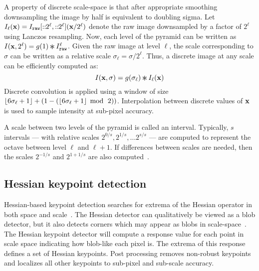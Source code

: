             A property of discrete scale-space is that after appropriate smoothing downsampling the image by half
            is equivalent to doubling sigma. Let
            $I_\ell(\mathbf{x}) = I_{\tt{raw}}[::\mkern-6mu2^{\ell},::\mkern-6mu2^{\ell}]({\mathbf{x}} / {2^{\ell}})$ 
            denote the raw image downsampled by a factor of $2^{\ell}$ using Lanczos resampling. Now, each level of
            the pyramid can be written as %
            $\img(\pt, 2^\ell) = g( 1 ) \conv \rawimg^\ell$. Given the raw image at level $\ell$, the scale
            corresponding to $\sigma$ can be written as a relative scale
            $\sigma_\ell = \sigma / 2^\ell$.
            Thus, a discrete image at any scale can be efficiently computed as:
            \begin{equation}
                \img(\pt, \sigma) =
                    g(\sigma_\ell) \conv \img_\ell(\pt)
            \end{equation}
            Discrete convolution is applied using a window of size
              $\left\lfloor{} 6\sigma_\ell + 1 \right\rfloor + (1 -
              (\left\lfloor{} 6\sigma_\ell + 1 \right\rfloor\; \operatorname{mod}{} \;\,2))$.
            Interpolation between discrete values of $\mathbf{x}$ is used to
              sample intensity at sub-pixel accuracy.

            A scale between two levels of the pyramid is called an interval. Typically, $s$ intervals --- with
            relative scales $2^{0/s}, 2^{1/s}, \ldots 2^{s/s}$ --- are computed to represent the octave between
            level $\ell$ and $\ell + 1$. If differences between scales are needed, then the scales $2^{-1/s}$ and
            $2^{1 + 1/s}$ are also computed~\cite{lowe_distinctive_2004}.

    \subsection{Hessian keypoint detection}

        Hessian-based keypoint detection searches for extrema of the Hessian operator in both space and
        scale~\cite{beaudet_rotationally_1978, lindeberg_shape_adapted_1994}. The Hessian detector can
        qualitatively be viewed as a blob detector, but it also detects corners which may appear as blobs in
        scale-space~\cite{tuytelaars_local_2007}. The Hessian keypoint detector will compute a response value for
        each point in scale space indicating how blob-like each pixel is. The extrema of this response defines a
        set of Hessian keypoints. Post processing removes non-robust keypoints and localizes all other keypoints to
        sub-pixel and sub-scale accuracy.

